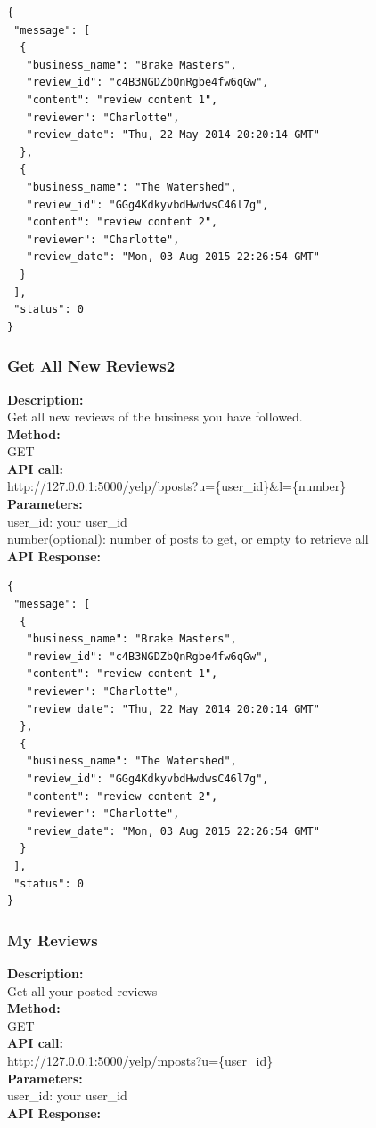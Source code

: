 \documentclass[12pt]{article}
\begin{document}
\begin{singlespacing}
\begin{lstlisting}
{
 "message": [
  {
   "business_name": "Brake Masters",
   "review_id": "c4B3NGDZbQnRgbe4fw6qGw",
   "content": "review content 1",
   "reviewer": "Charlotte",
   "review_date": "Thu, 22 May 2014 20:20:14 GMT"
  },
  {
   "business_name": "The Watershed",
   "review_id": "GGg4KdkyvbdHwdwsC46l7g",
   "content": "review content 2",
   "reviewer": "Charlotte",
   "review_date": "Mon, 03 Aug 2015 22:26:54 GMT"
  }
 ],
 "status": 0
}
\end{lstlisting}
\end{singlespacing}

\subsubsection{Get All New Reviews2}
\textbf{Description:}\\
Get all new reviews of the business you have followed.\\
\textbf{Method:}\\
GET\\
\textbf{API call:}\\ 
http://127.0.0.1:5000/yelp/bposts?u=\{user\_id\}\&l=\{number\}\\
\textbf{Parameters:}\\
user\_id: your user\_id\\
number(optional): number of posts to get, or empty to retrieve all\\
\textbf{API Response:}

\begin{singlespacing}
\begin{lstlisting}
{
 "message": [
  {
   "business_name": "Brake Masters",
   "review_id": "c4B3NGDZbQnRgbe4fw6qGw",
   "content": "review content 1",
   "reviewer": "Charlotte",
   "review_date": "Thu, 22 May 2014 20:20:14 GMT"
  },
  {
   "business_name": "The Watershed",
   "review_id": "GGg4KdkyvbdHwdwsC46l7g",
   "content": "review content 2",
   "reviewer": "Charlotte",
   "review_date": "Mon, 03 Aug 2015 22:26:54 GMT"
  }
 ],
 "status": 0
}
\end{lstlisting}
\end{singlespacing}

\subsubsection{My Reviews}
\textbf{Description:}\\
Get all your posted reviews\\
\textbf{Method:}\\
GET\\
\textbf{API call:}\\ 
http://127.0.0.1:5000/yelp/mposts?u=\{user\_id\}\\
\textbf{Parameters:}\\
user\_id: your user\_id\\
\textbf{API Response:}
\end{document}
